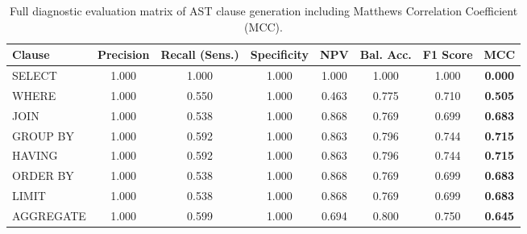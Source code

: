\begin{table}[t]
\centering\small
\begin{tabular}{lccccccc}
\toprule
\textbf{Clause} & \textbf{Precision} & \textbf{Recall (Sens.)} & \textbf{Specificity} & \textbf{NPV} & \textbf{Bal. Acc.} & \textbf{F1 Score} & \textbf{MCC} \\
\midrule
SELECT & 1.000 & 1.000 & 1.000 & 1.000 & 1.000 & 1.000 & \textbf{0.000} \\
WHERE & 1.000 & 0.550 & 1.000 & 0.463 & 0.775 & 0.710 & \textbf{0.505} \\
JOIN & 1.000 & 0.538 & 1.000 & 0.868 & 0.769 & 0.699 & \textbf{0.683} \\
GROUP BY & 1.000 & 0.592 & 1.000 & 0.863 & 0.796 & 0.744 & \textbf{0.715} \\
HAVING & 1.000 & 0.592 & 1.000 & 0.863 & 0.796 & 0.744 & \textbf{0.715} \\
ORDER BY & 1.000 & 0.538 & 1.000 & 0.868 & 0.769 & 0.699 & \textbf{0.683} \\
LIMIT & 1.000 & 0.538 & 1.000 & 0.868 & 0.769 & 0.699 & \textbf{0.683} \\
AGGREGATE & 1.000 & 0.599 & 1.000 & 0.694 & 0.800 & 0.750 & \textbf{0.645} \\
\bottomrule
\end{tabular}
\caption{Full diagnostic evaluation matrix of AST clause generation including Matthews Correlation Coefficient (MCC).}
\label{tab:diagnostic_clause_matrix}
\end{table}
